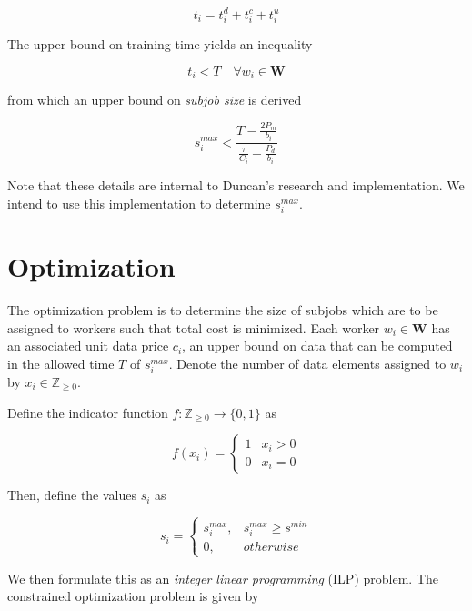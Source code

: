 \documentclass[
    draft,
    final,
]{article}
\begin{document}
    \[t_i = t^d_i + t^c_i + t^u_i\]
    
    The upper bound on training time yields an inequality
    
    \[t_i < T \quad \forall w_i \in \mathbf{W}\]
    
    from which an upper bound on \textit{subjob size} is derived
    
    \[s^{max}_i < \frac{T - \frac{2 P_m}{b_i}}{\frac{\tau}{C_i} - \frac{P_d}{b_i}}\]
    
    Note that these details are internal to Duncan's research and implementation. We intend to use this implementation to determine $s^{max}_i$.
    
    \section{Optimization}
    
    The optimization problem is to determine the size of subjobs which are to be assigned to workers such that total cost is minimized. Each worker $w_i \in \mathbf{W}$ has an associated unit data price $c_i$, an upper bound on data that can be computed in the allowed time $T$ of $s^{max}_i$. Denote the number of data elements assigned to $w_i$ by $x_i \in \mathbb{Z}_{\geq 0}$.
    
    Define the indicator function $f: \mathbb{Z}_{\geq 0} \rightarrow \{0, 1\}$ as
    
    \[f(x_i) = 
        \begin{cases} 
          1 & x_i > 0 \\
          0 & x_i = 0
       \end{cases}
    \]
    
    Then, define the values $s_i$ as
    
    \[s_i = 
        \begin{cases} 
          s^{max}_i, & s^{max}_i \geq s^{min} \\
          0, & otherwise
       \end{cases}
    \]
    
    
    We then formulate this as an \textit{integer linear programming} (ILP) problem. The constrained optimization problem is given by
    
\end{document}
